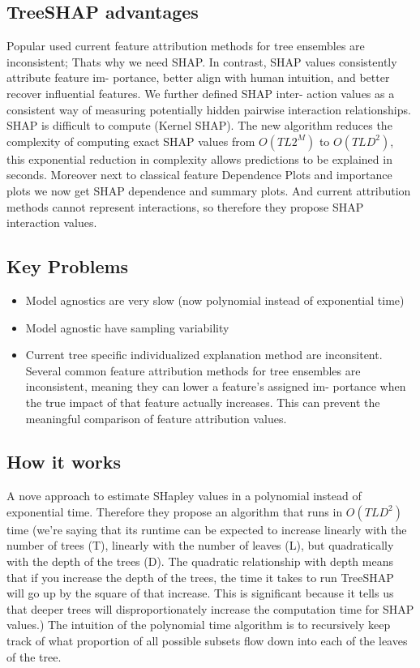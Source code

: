 \documentclass[12pt]{article}
\begin{document}
\subsection{TreeSHAP advantages}
Popular used current feature attribution methods for tree ensembles are inconsistent; Thats why we need SHAP. In contrast, SHAP values consistently attribute feature im- portance, better align with human intuition, and better recover influential features.  We further defined SHAP inter- action values as a consistent way of measuring potentially hidden pairwise interaction relationships. 
SHAP is difficult to compute (Kernel SHAP). The new algorithm reduces the complexity of computing exact SHAP values from $O(TL2^M)$ to $O(TLD^2)$, this exponential reduction in complexity allows predictions to be explained in seconds. Moreover next to classical feature Dependence Plots and importance plots we now get SHAP dependence and summary plots. 
And current attribution methods cannot represent interactions, so therefore they propose SHAP interaction values. 
\subsection{Key Problems}
\begin{itemize}
\item Model agnostics are very slow (now polynomial instead of exponential time)
\item Model agnostic have sampling variability
\item Current tree specific individualized explanation method are inconsitent. Several common feature attribution methods for tree ensembles are inconsistent, meaning they can lower a feature’s assigned im- portance when the true impact of that feature actually increases. This can prevent the meaningful comparison of feature attribution values. 
\end{itemize}

\subsection{How it works}
A nove approach to estimate SHapley values in a polynomial instead of exponential time. Therefore they propose an algorithm that runs in $O(TLD^2)$ time (we're saying that its runtime can be expected to increase linearly with the number of trees (T), linearly with the number of leaves (L), but quadratically with the depth of the trees (D). The quadratic relationship with depth means that if you increase the depth of the trees, the time it takes to run TreeSHAP will go up by the square of that increase. This is significant because it tells us that deeper trees will disproportionately increase the computation time for SHAP values.)
The intuition of the polynomial time algorithm is to recursively keep track of what proportion of all possible subsets flow down into each of the leaves of the tree. 
\end{document}
